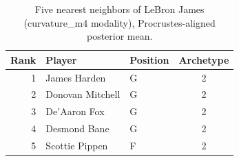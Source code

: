 \begin{table}[htbp]
  \centering\small
  \begin{tabular}{rllc}
    \toprule
    Rank & Player & Position & Archetype \\
    \midrule
    1 & James Harden & G & 2 \\
    2 & Donovan Mitchell & G & 2 \\
    3 & De'Aaron Fox & G & 2 \\
    4 & Desmond Bane & G & 2 \\
    5 & Scottie Pippen & F & 2 \\
    \bottomrule
  \end{tabular}
  \caption{Five nearest neighbors of LeBron James (curvature_m4 modality), Procrustes-aligned posterior mean.}
  \label{tab:LeBron_James_neighbors_curvature_m4}
\end{table}

